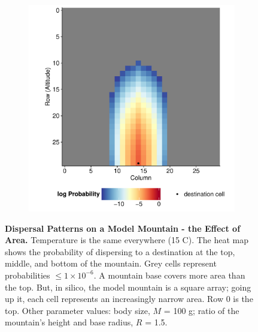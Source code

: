 \documentclass[11pt]{article}
\begin{document}
\begin{figure}[!hbtp]
	\begin{subfigure}{\textwidth}
		\centering
		\includegraphics[width=0.5\linewidth]{../Results/DispMaps/AreaNoTemp100Bottom.pdf}
	\end{subfigure}

	\caption{\textbf{Dispersal Patterns on a Model Mountain - the Effect of Area.} Temperature is the same everywhere (15 \degree C). The heat map shows the probability of dispersing to a destination at the top, middle, and bottom of the mountain. Grey cells represent probabilities $\leq 1 \times 10^{-6}$. A mountain base covers more area than the top. But, in silico, the model mountain is a square array; going up it, each cell represents an increasingly narrow area. Row 0 is the top. Other parameter values: body size, $M$ = 100 g; ratio of the mountain's height and base radius, $R$ = 1.5.}
\label{DispMapAreaNoTemp}
\end{figure}
\end{document}
